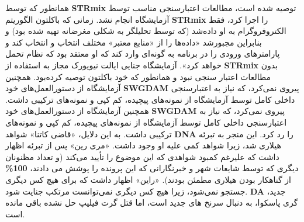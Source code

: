 همانطور که توسط \textenglish{\textbf{STRmix}} توصیه شده است، مطالعات اعتبارسنجی مناسب توسط آزمایشگاه انجام نشد.
زمانی که باکلتون الگوریتم \textenglish{\textbf{STRmix}} را اجرا کرد، فقط الکتروفروگرام به او داده‌شد (که توسط تحلیلگر به شکلی مغرضانه تهیه شده بود) و بنابراین مجبور‌شد «داده‌ها را از «منابع معتبر» مختلف انتخاب و انتخاب کند و پارامترهای ورودی را در برنامه به گونه‌ای وارد کند که او معتقد بود که نظام تحمل خواهد کرد».
آزمایشگاه جنایی ایالت نیویورک مجاز به استفاده از \textenglish{\textbf{STRmix}} بدون مطالعات اعتبار سنجی نبود و همانطور که خود باکلتون توصیه کرده‌بود.
همچنین آزمایشگاه از دستورالعمل‌های خود \textenglish{\textbf{SWGDAM}} پیروی نمی‌کرد، که نیاز به اعتبارسنجی داخلی کامل توسط آزمایشگاه از نمونه‌های پیچیده، کم کپی و نمونه‌های ترکیبی داشت.
همچنین آزمایشگاه از دستورالعمل‌های خود \textenglish{\textbf{SWGDAM}} پیروی نمی‌کرد، که نیاز به اعتبارسنجی داخلی کامل توسط آزمایشگاه از نمونه‌های پیچیده، کم کپی و نمونه‌های ترکیبی داشت.
به این دلایل، «قاضی کاتنا» شواهد \textenglish{\textbf{DNA}} را رد کرد.
این منجر به تبرئه هیلاری شد، زیرا شواهد کمی علیه او وجود داشت.
«مری رین» پس از تبرئه اظهار داشت که علیرغم کمبود شواهدی که این موضوع را تأیید می‌کند (و تعداد مظنونان دیگری که توسط شایعات شهر و خبرنگارانی که این پرونده را پوشش می دادند، \textenglish{\textbf{100\%}} از گناهکار بودن هیلاری مطمئن بودند).
«راین» اظهار داشت که برای هیچ کس دیگری جستجو نمی‌شود، زیرا هیچ کس دیگری نمی‌توانست مرتکب جنایت شود.
\textenglish{\textbf{DA}} جدید، گری پاسکوا، به دنبال سرنخ های جدید است، اما قتل گرت فیلیپ حل نشده باقی مانده است.

